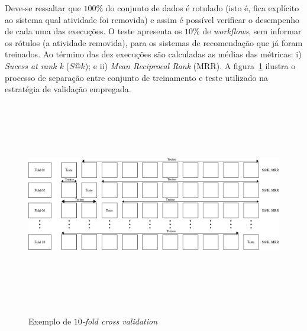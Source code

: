 Deve-se ressaltar que \(100\%\) do conjunto de dados é rotulado (isto é, fica explícito ao sistema qual atividade foi removida) e assim é possível verificar o desempenho de cada uma das execuções. O teste apresenta os \(10\%\) de \emph{workflows}, sem informar os rótulos (a atividade removida), para os sistemas de recomendação que já foram treinados. Ao término das dez execuções são calculadas as médias das métricas: i) \emph{Sucess at rank k} (\(S@k\)); e ii) \emph{Mean Reciprocal Rank} (MRR). A figura~\ref{figura_10_fold_cross_validation} ilustra o processo de separação entre conjunto de treinamento e teste utilizado na estratégia de validação empregada.
\begin{figure}[!hbt]
	\centering   
	\caption{Exemplo de \emph{$10$-fold cross validation}}
	\includegraphics[width=14cm, height=9cm]{./secoes/conceitosFundamentais/pics/img/10FOLDCROSS.eps}
	\vspace{0.1cm}
	\label{figura_10_fold_cross_validation}
\end{figure}

